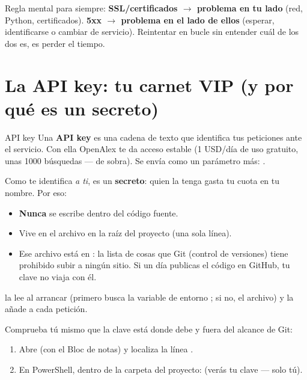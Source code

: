 \documentclass[11pt,a4paper]{article}
\begin{document}
\begin{ojo}
Regla mental para siempre: \textbf{SSL/certificados $\rightarrow$ problema en tu lado}
(red, Python, certificados). \textbf{5xx $\rightarrow$ problema en el lado de ellos}
(esperar, identificarse o cambiar de servicio). Reintentar en bucle sin entender cuál de
los dos es, es perder el tiempo.
\end{ojo}

\section{La API key: tu carnet VIP (y por qué es un secreto)}

\begin{concepto}{API key}
Una \textbf{API key} es una cadena de texto que identifica tus peticiones ante el
servicio. Con ella OpenAlex te da acceso estable (1 USD/día de uso gratuito, unas 1000
búsquedas — de sobra). Se envía como un parámetro más: .

Como te identifica \emph{a ti}, es un \textbf{secreto}: quien la tenga gasta tu cuota en
tu nombre. Por eso:
\begin{itemize}
  \item \textbf{Nunca} se escribe dentro del código fuente.
  \item Vive en el archivo  en la raíz del proyecto (una sola línea).
  \item Ese archivo está en : la lista de cosas que Git (control de
        versiones) tiene prohibido subir a ningún sitio. Si un día publicas el código en
        GitHub, tu clave no viaja con él.
\end{itemize}
 la lee al arrancar (primero busca la variable de entorno
; si no, el archivo) y  la añade a cada petición.
\end{concepto}

\begin{practica}
Comprueba tú mismo que la clave está donde debe y fuera del alcance de Git:
\begin{enumerate}
  \item Abre  (con el Bloc de notas) y localiza la línea .
  \item En PowerShell, dentro de la carpeta del proyecto:
         \quad (verás tu clave — solo tú).
\end{enumerate}
\end{practica}
\end{document}
